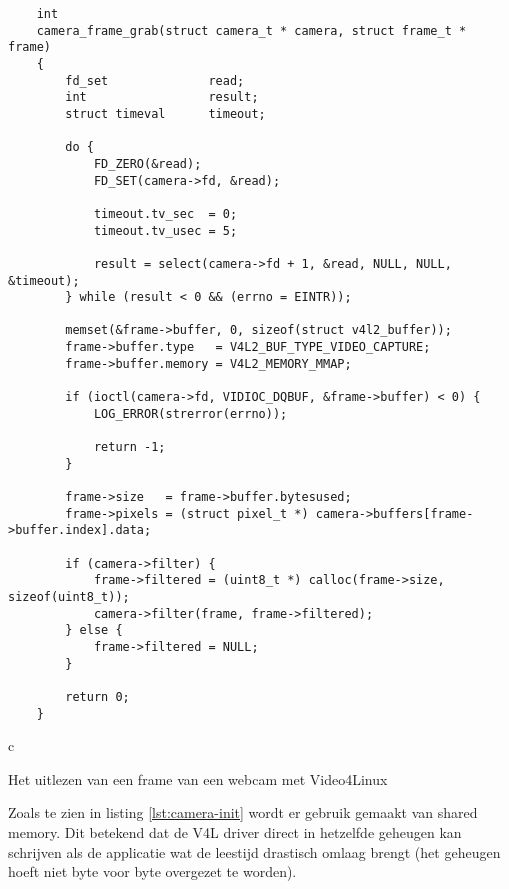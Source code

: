 \begin{listing}
    \begin{verbatim}
    int
    camera_frame_grab(struct camera_t * camera, struct frame_t * frame)
    {
        fd_set              read;
        int                 result;
        struct timeval      timeout;

        do {
            FD_ZERO(&read);
            FD_SET(camera->fd, &read);

            timeout.tv_sec  = 0;
            timeout.tv_usec = 5;

            result = select(camera->fd + 1, &read, NULL, NULL, &timeout);
        } while (result < 0 && (errno = EINTR));

        memset(&frame->buffer, 0, sizeof(struct v4l2_buffer));
        frame->buffer.type   = V4L2_BUF_TYPE_VIDEO_CAPTURE;
        frame->buffer.memory = V4L2_MEMORY_MMAP;

        if (ioctl(camera->fd, VIDIOC_DQBUF, &frame->buffer) < 0) {
            LOG_ERROR(strerror(errno));

            return -1;
        }

        frame->size   = frame->buffer.bytesused;
        frame->pixels = (struct pixel_t *) camera->buffers[frame->buffer.index].data;

        if (camera->filter) {
            frame->filtered = (uint8_t *) calloc(frame->size, sizeof(uint8_t));
            camera->filter(frame, frame->filtered);
        } else {
            frame->filtered = NULL;
        }

        return 0;
    }
    \end{verbatim}{c}
    \caption{Het uitlezen van een frame van een webcam met Video4Linux}
\end{listing}

Zoals te zien in listing \ref{lst:camera-init} wordt er gebruik gemaakt van
shared memory. Dit betekend dat de V4L driver direct in hetzelfde geheugen kan
schrijven als de \autonerf applicatie wat de leestijd drastisch omlaag brengt
(het geheugen hoeft niet byte voor byte overgezet te worden).
